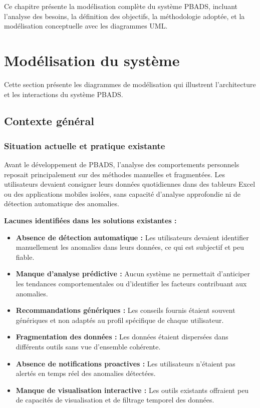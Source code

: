 Ce chapitre présente la modélisation complète du système PBADS, incluant l'analyse des besoins, la définition des objectifs, la méthodologie adoptée, et la modélisation conceptuelle avec les diagrammes UML.

\section{Modélisation du système}

Cette section présente les diagrammes de modélisation qui illustrent l'architecture et les interactions du système PBADS.

\subsection{Contexte général}

\subsubsection{Situation actuelle et pratique existante}

Avant le développement de PBADS, l'analyse des comportements personnels reposait principalement sur des méthodes manuelles et fragmentées. Les utilisateurs devaient consigner leurs données quotidiennes dans des tableurs Excel ou des applications mobiles isolées, sans capacité d'analyse approfondie ni de détection automatique des anomalies.

\textbf{Lacunes identifiées dans les solutions existantes :}

\begin{itemize}
    \item \textbf{Absence de détection automatique :} Les utilisateurs devaient identifier manuellement les anomalies dans leurs données, ce qui est subjectif et peu fiable.
    \item \textbf{Manque d'analyse prédictive :} Aucun système ne permettait d'anticiper les tendances comportementales ou d'identifier les facteurs contribuant aux anomalies.
    \item \textbf{Recommandations génériques :} Les conseils fournis étaient souvent génériques et non adaptés au profil spécifique de chaque utilisateur.
    \item \textbf{Fragmentation des données :} Les données étaient dispersées dans différents outils sans vue d'ensemble cohérente.
    \item \textbf{Absence de notifications proactives :} Les utilisateurs n'étaient pas alertés en temps réel des anomalies détectées.
    \item \textbf{Manque de visualisation interactive :} Les outils existants offraient peu de capacités de visualisation et de filtrage temporel des données.
\end{itemize}

